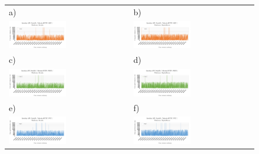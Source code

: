 \begin{figure}[H]
  \centering
	\begin{tabular}{@{}ll@{}}
    a) & b) \\
    \includegraphics[width=0.49\textwidth]{rys05/nodejs-get-heroku.pdf} & \includegraphics[width=0.49\textwidth]{rys05/nodejs-get-digitalocean.pdf} \\
    c) & d) \\
    \includegraphics[width=0.49\textwidth]{rys05/nodejs-post-heroku.pdf} & \includegraphics[width=0.49\textwidth]{rys05/nodejs-post-digitalocean.pdf} \\
    e) & f) \\
    \includegraphics[width=0.49\textwidth]{rys05/nodejs-put-heroku.pdf} & \includegraphics[width=0.49\textwidth]{rys05/nodejs-put-digitalocean.pdf} \\

\end{tabular}
\end{figure}
